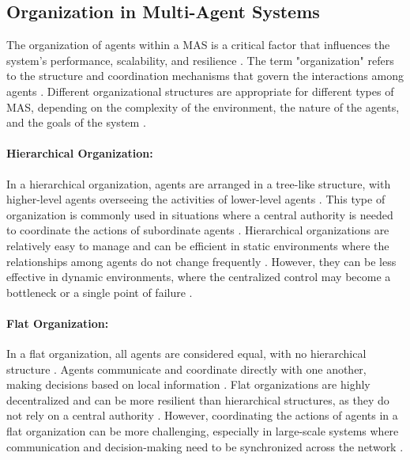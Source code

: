 \subsection{Organization in Multi-Agent Systems}

The organization of agents within a MAS is a critical factor that influences the system's performance, scalability, and resilience \cite{wooldridge2009introduction}. The term "organization" refers to the structure and coordination mechanisms that govern the interactions among agents \cite{weiss1999multiagent}. Different organizational structures are appropriate for different types of MAS, depending on the complexity of the environment, the nature of the agents, and the goals of the system \cite{durfee1999distributed}.

\paragraph{Hierarchical Organization:}
In a hierarchical organization, agents are arranged in a tree-like structure, with higher-level agents overseeing the activities of lower-level agents \cite{wooldridge2009introduction}. This type of organization is commonly used in situations where a central authority is needed to coordinate the actions of subordinate agents \cite{durfee1999distributed}. Hierarchical organizations are relatively easy to manage and can be efficient in static environments where the relationships among agents do not change frequently \cite{weiss1999multiagent}. However, they can be less effective in dynamic environments, where the centralized control may become a bottleneck or a single point of failure \cite{durfee1999distributed}.

\paragraph{Flat Organization:}
In a flat organization, all agents are considered equal, with no hierarchical structure \cite{weiss1999multiagent}. Agents communicate and coordinate directly with one another, making decisions based on local information \cite{durfee1999distributed}. Flat organizations are highly decentralized and can be more resilient than hierarchical structures, as they do not rely on a central authority \cite{weiss1999multiagent}. However, coordinating the actions of agents in a flat organization can be more challenging, especially in large-scale systems where communication and decision-making need to be synchronized across the network \cite{durfee1999distributed}.

